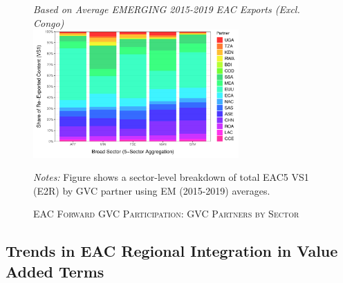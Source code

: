 \documentclass[a4paper]{article}
\begin{document}
\begin{figure}[h!] 
\centering
\caption{\label{fig:EACVS1_ctry_sec}\textsc{EAC Forward GVC Participation: GVC Partners by Sector}}
\small{\textit{Based on Average EMERGING 2015-2019 EAC Exports (Excl. Congo)}} \\
\vspace{1mm}
\includegraphics[width=0.7\textwidth]{"VS1_shares_sec_ctry.pdf"} \\ \raggedright
\scriptsize
\vspace{-1mm}
\emph{Notes:} Figure shows a sector-level breakdown of total EAC5 VS1 (E2R) by GVC partner using EM (2015-2019) averages. %
\end{figure}
\FloatBarrier



\subsection{Trends in EAC Regional Integration in Value Added Terms}
\end{document}
